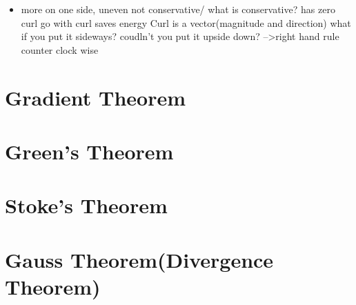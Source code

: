 \documentclass[12pt,a4paper]{article}
\begin{document}
\begin{itemize}
		\item more on one side, 
		uneven
		not conservative/ what is conservative? has zero curl 
		go with curl saves energy 
		Curl is a vector(magnitude and direction) what if you put it sideways? coudln't you put it upside down?
		-->right hand rule counter clock wise

		 
	\end{itemize}
	
	\newpage
	
	\section{Gradient Theorem}
	
	\newpage
	
	\section{Green's Theorem}
	
	\newpage
	
	\section{Stoke's Theorem}
	
	\newpage
	
	\section{Gauss Theorem(Divergence Theorem)}
	
	
	

	
	
	

	
\end{document}
